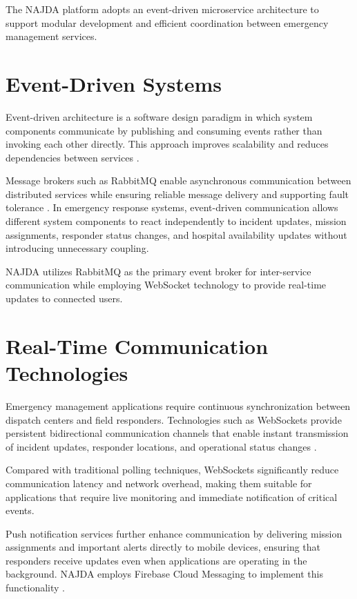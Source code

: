 The NAJDA platform adopts an event-driven microservice architecture to support modular development and efficient coordination between emergency management services.

\section{Event-Driven Systems}

Event-driven architecture is a software design paradigm in which system components communicate by publishing and consuming events rather than invoking each other directly. This approach improves scalability and reduces dependencies between services \cite{richardson2018microservices}.

Message brokers such as RabbitMQ enable asynchronous communication between distributed services while ensuring reliable message delivery and supporting fault tolerance \cite{rabbitmq}. In emergency response systems, event-driven communication allows different system components to react independently to incident updates, mission assignments, responder status changes, and hospital availability updates without introducing unnecessary coupling.

NAJDA utilizes RabbitMQ as the primary event broker for inter-service communication while employing WebSocket technology to provide real-time updates to connected users.

\section{Real-Time Communication Technologies}

Emergency management applications require continuous synchronization between dispatch centers and field responders. Technologies such as WebSockets provide persistent bidirectional communication channels that enable instant transmission of incident updates, responder locations, and operational status changes \cite{websocket}.

Compared with traditional polling techniques, WebSockets significantly reduce communication latency and network overhead, making them suitable for applications that require live monitoring and immediate notification of critical events.

Push notification services further enhance communication by delivering mission assignments and important alerts directly to mobile devices, ensuring that responders receive updates even when applications are operating in the background. NAJDA employs Firebase Cloud Messaging to implement this functionality \cite{firebase}.

